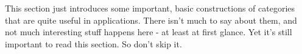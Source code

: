 This section just introduces some important, basic constructions of categories that are quite useful in applications.
There isn't much to say about them, and not much interesting stuff happens here - at least at first glance.
Yet it's still important to read this section.
So don't skip it.
